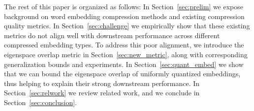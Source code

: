 The rest of this paper is organized as follows:
In Section~\ref{sec:prelim} we expose background on word embedding compression methods and existing compression quality metrics.
In Section~\ref{sec:challenge} we empirically show that these existing metrics do not align well with downstream performance across different compressed embedding types.
To address this poor alignment, we introduce the eigenspace overlap metric in Section~\ref{sec:new_metric}, along with corresponding generalization bounds and experiments.
In Section~\ref{sec:quant_embed} we show that we can bound the eigenspace overlap of uniformly quantized embeddings, thus helping to explain their strong downstream performance.
In Section~\ref{sec:relwork} we review related work, and we conclude in Section~\ref{sec:conclusion}.


%
%
